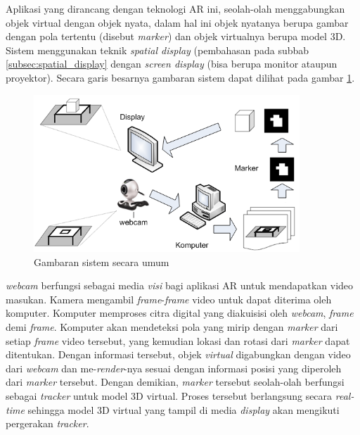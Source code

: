 Aplikasi yang dirancang dengan teknologi AR ini, seolah-olah menggabungkan objek virtual dengan objek nyata, dalam hal ini objek nyatanya berupa gambar dengan pola tertentu (disebut \textit{marker}) dan objek virtualnya berupa model 3D. Sistem menggunakan teknik \textit{spatial display} (pembahasan pada subbab \ref{subsec:spatial_display} dengan \textit{screen display} (bisa berupa monitor ataupun proyektor). Secara garis besarnya gambaran sistem dapat dilihat pada gambar \ref{fig:gambaran_sistem_ar}. 
\begin{figure}[h]
\begin{center}
\includegraphics[width=10cm]{./images/gambaran_sistem_ar}
\caption{\label{fig:gambaran_sistem_ar} Gambaran sistem secara umum}
\end{center}
\end{figure}

\textit{webcam} berfungsi sebagai media \textit{visi} bagi aplikasi AR untuk mendapatkan video masukan. Kamera mengambil \textit{frame}-\textit{frame} video untuk dapat diterima oleh komputer. Komputer memproses citra digital yang diakuisisi oleh \textit{webcam}, \textit{frame} demi \textit{frame}. Komputer akan mendeteksi pola yang mirip dengan \textit{marker} dari setiap \textit{frame} video tersebut, yang kemudian lokasi dan rotasi dari \textit{marker} dapat ditentukan. Dengan informasi tersebut, objek \textit{virtual} digabungkan dengan video dari \textit{webcam} dan me-\textit{render}-nya sesuai dengan informasi posisi yang diperoleh dari \textit{marker} tersebut. Dengan demikian, \textit{marker} tersebut seolah-olah berfungsi sebagai \textit{tracker} untuk model 3D virtual. Proses tersebut berlangsung secara \textit{real-time} sehingga model 3D virtual yang tampil di media \textit{display} akan mengikuti pergerakan \textit{tracker}.

